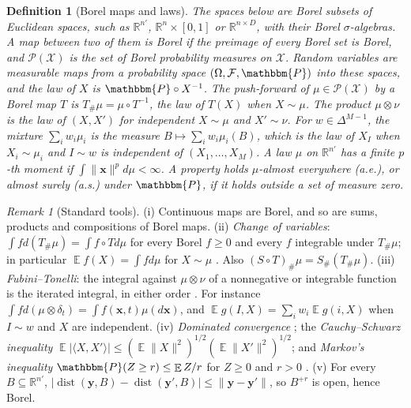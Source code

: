 \documentclass{article}
\DeclareMathOperator{\E}{\mathbb{E}}
\DeclareMathOperator{\dist}{dist}
\newcommand{\RR}{\mathbb{R}}
\newcommand{\PP}{\mathbbm{P}}
\newcommand{\bx}{\mathbf{x}}
\newcommand{\by}{\mathbf{y}}
\theoremstyle{plain}
\newtheorem{definition}[theorem]{Definition}
\theoremstyle{remark}
\newtheorem{remark}[theorem]{Remark}
\begin{document}
\begin{definition}[Borel maps and laws]\label{def:borel}
The spaces below are Borel subsets of Euclidean spaces, such as $\RR^{n'}$, $\RR^n\times[0,1]$ or $\RR^{n\times D}$, with their Borel
$\sigma$-algebras. A map between two of them is \emph{Borel} if the preimage of every Borel set is Borel, and $\mathcal P(\mathcal X)$ is the set
of Borel probability measures on $\mathcal X$. Random variables are measurable maps from a probability space $(\Omega,\mathcal F,\PP)$ into
these spaces, and the \emph{law} of $X$ is $\PP\circ X^{-1}$. The \emph{push-forward} of $\mu\in\mathcal P(\mathcal X)$ by a Borel map $T$ is
$T_\#\mu=\mu\circ T^{-1}$, the law of $T(X)$ when $X\sim\mu$. The \emph{product} $\mu\otimes\nu$ is the law of $(X,X')$ for independent $X\sim\mu$
and $X'\sim\nu$. For $w\in\Delta^{M-1}$, the \emph{mixture} $\sum_iw_i\mu_i$ is the measure $B\mapsto\sum_iw_i\mu_i(B)$, which is the law of $X_I$
when $X_i\sim\mu_i$ and $I\sim w$ is independent of $(X_1,\dots,X_M)$. A law $\mu$ on $\RR^{n'}$ has a \emph{finite $p$-th moment} if
$\int\|\bx\|^pd\mu<\infty$. A property holds $\mu$-\emph{almost everywhere} (a.e.), or \emph{almost surely} (a.s.) under $\PP$, if it holds
outside a set of measure zero.
\end{definition}

\begin{remark}[Standard tools]\label{rem:tools}
(i) Continuous maps are Borel, and so are sums, products and compositions of Borel maps.
(ii) \emph{Change of variables}: $\int fd(T_\#\mu)=\int f\circ Td\mu$ for every Borel $f\ge0$ and every $f$ integrable under $T_\#\mu$; in
particular $\E f(X)=\int fd\mu$ for $X\sim\mu$ \citep[Sec.~6.12]{williams1991probability}. Also $(S\circ T)_\#\mu=S_\#(T_\#\mu)$.
(iii) \emph{Fubini--Tonelli}: the integral against $\mu\otimes\nu$ of a nonnegative or integrable function is the iterated integral, in either
order \citep[Thms.~4.4--4.5]{brezis2011functional}. For instance $\int fd(\mu\otimes\delta_t)=\int f(\bx,t)\mu(d\bx)$, and
$\E g(I,X)=\sum_iw_i\E g(i,X)$ when $I\sim w$ and $X$ are independent.
(iv) \emph{Dominated convergence} \citep[Thm.~4.2]{brezis2011functional}; the \emph{Cauchy--Schwarz inequality}
$\E|\langle X,X'\rangle|\le(\E\|X\|^2)^{1/2}(\E\|X'\|^2)^{1/2}$; and \emph{Markov's inequality} $\PP(Z\ge r)\le\E Z/r$ for $Z\ge0$ and $r>0$
\citep[Secs.~6.4 and 6.8]{williams1991probability}.
(v) For every $B\subseteq\RR^{n'}$, $|\dist(\by,B)-\dist(\by',B)|\le\|\by-\by'\|$, so $B^{+r}$ is open, hence Borel.
\end{remark}
\end{document}

